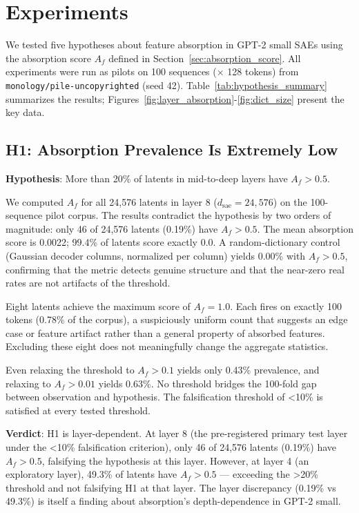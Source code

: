 \documentclass{article}
\begin{document}
\section{Experiments}

We tested five hypotheses about feature absorption in GPT-2 small SAEs using the absorption score $A_f$ defined in Section~\ref{sec:absorption_score}. All experiments were run as pilots on 100 sequences ($\times$ 128 tokens) from \texttt{monology/pile-uncopyrighted} (seed 42). Table~\ref{tab:hypothesis_summary} summarizes the results; Figures~\ref{fig:layer_absorption}-\ref{fig:dict_size} present the key data.

\subsection{H1: Absorption Prevalence Is Extremely Low}
\label{sec:h1}

\textbf{Hypothesis}: More than 20\% of latents in mid-to-deep layers have $A_f > 0.5$.

We computed $A_f$ for all 24,576 latents in layer 8 ($d_{\text{sae}} = 24{,}576$) on the 100-sequence pilot corpus. The results contradict the hypothesis by two orders of magnitude: only 46 of 24,576 latents (0.19\%) have $A_f > 0.5$. The mean absorption score is 0.0022; 99.4\% of latents score exactly 0.0. A random-dictionary control (Gaussian decoder columns, normalized per column) yields 0.00\% with $A_f > 0.5$, confirming that the metric detects genuine structure and that the near-zero real rates are not artifacts of the threshold.

Eight latents achieve the maximum score of $A_f = 1.0$. Each fires on exactly 100 tokens (0.78\% of the corpus), a suspiciously uniform count that suggests an edge case or feature artifact rather than a general property of absorbed features. Excluding these eight does not meaningfully change the aggregate statistics.

Even relaxing the threshold to $A_f > 0.1$ yields only 0.43\% prevalence, and relaxing to $A_f > 0.01$ yields 0.63\%. No threshold bridges the 100-fold gap between observation and hypothesis. The falsification threshold of <10\% is satisfied at every tested threshold.

\textbf{Verdict}: H1 is layer-dependent. At layer 8 (the pre-registered primary test layer under the <10\% falsification criterion), only 46 of 24,576 latents (0.19\%) have $A_f > 0.5$, falsifying the hypothesis at this layer. However, at layer 4 (an exploratory layer), 49.3\% of latents have $A_f > 0.5$ --- exceeding the >20\% threshold and not falsifying H1 at that layer. The layer discrepancy (0.19\% vs 49.3\%) is itself a finding about absorption's depth-dependence in GPT-2 small.
\end{document}
